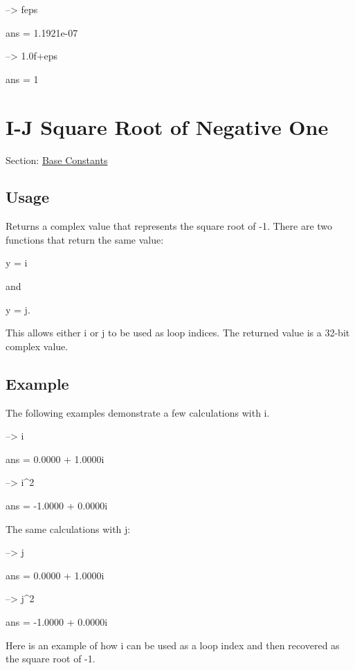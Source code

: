 \begin{DoxyVerbInclude}
--> feps

ans = 
 1.1921e-07 

--> 1.0f+eps

ans = 
 1 
\end{DoxyVerbInclude}
 \hypertarget{constants_i}{}\section{I-\/\-J Square Root of Negative One}\label{constants_i}
Section\-: \hyperlink{sec_constants}{Base Constants} \hypertarget{vtkwidgets_vtkxyplotwidget_Usage}{}\subsection{Usage}\label{vtkwidgets_vtkxyplotwidget_Usage}
Returns a {\ttfamily complex} value that represents the square root of -\/1. There are two functions that return the same value\-: \begin{DoxyVerb}   y = i
\end{DoxyVerb}
 and \begin{DoxyVerb}   y = j.
\end{DoxyVerb}
 This allows either {\ttfamily i} or {\ttfamily j} to be used as loop indices. The returned value is a 32-\/bit complex value. \hypertarget{variables_struct_Example}{}\subsection{Example}\label{variables_struct_Example}
The following examples demonstrate a few calculations with {\ttfamily i}.


\begin{DoxyVerbInclude}
--> i

ans = 
   0.0000 +  1.0000i 

--> i^2

ans = 
  -1.0000 +  0.0000i 
\end{DoxyVerbInclude}


The same calculations with {\ttfamily j}\-:


\begin{DoxyVerbInclude}
--> j

ans = 
   0.0000 +  1.0000i 

--> j^2

ans = 
  -1.0000 +  0.0000i 
\end{DoxyVerbInclude}


Here is an example of how {\ttfamily i} can be used as a loop index and then recovered as the square root of -\/1.


